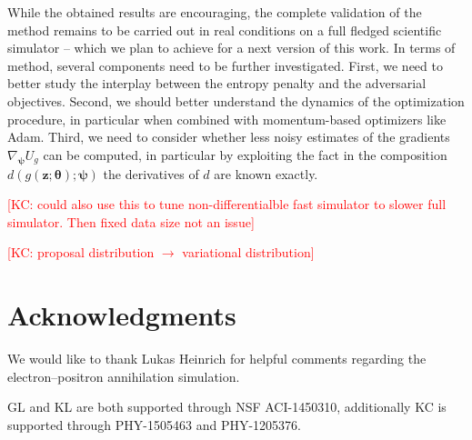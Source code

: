 \documentclass[twocolumn,superscriptaddress,aps]{revtex4-1}
\newcommand{\kcnote}[1]{\textcolor{red}{[KC: #1]}}
\newcommand{\bftheta}{{\bm \theta}}
\newcommand{\bfpsi}{{\bm \psi}}
\newcommand{\bfz}{\mathbf{z}}
\theoremstyle{plain}
\begin{document}
While the obtained results are encouraging, the complete validation of the
method remains to be carried out in real conditions on a full fledged scientific
simulator -- which we plan to achieve for a next version of this work.
In terms of method, several components need to be further investigated.
First, we need to better study the interplay between the entropy penalty and the adversarial objectives.
Second, we should better understand the dynamics of the optimization
procedure, in particular when combined with momentum-based optimizers like Adam.
Third, we need to consider whether less noisy estimates of the gradients
$\nabla_\bfpsi U_g$ can be computed, in particular by exploiting the fact in the composition $d(g(\bfz;\bftheta); \bfpsi)$
the derivatives of $d$ are known exactly.


\kcnote{could also use this to tune non-differentialble fast simulator to slower full simulator. Then fixed data size not an issue}

\kcnote{proposal distribution $\to$ variational distribution}


\section*{Acknowledgments}

We would like to thank Lukas Heinrich for helpful comments regarding
the electron--positron annihilation simulation.

GL and KL are both supported through NSF ACI-1450310, additionally KC is
supported through PHY-1505463 and PHY-1205376.



%


\end{document}
